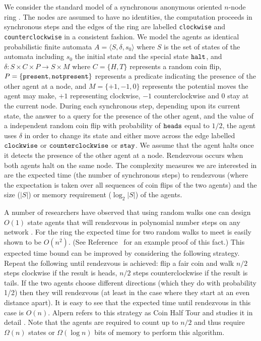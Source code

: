 \documentclass[lotsofwhite]{patmorin}
\begin{document}
We consider the standard model of a synchronous anonymous oriented
$n$-node ring \cite{santoro}. The nodes are assumed to have no
identities, the computation proceeds in synchronous steps and the
edges of the ring are labelled {\tt clockwise} and {\tt
counterclockwise} in a consistent fashion.  We model the agents as
identical probabilistic finite automata $A = \langle S, \delta, s_0
\rangle$ where
$S$ is the set of states of the automata including $s_0$ the initial
state and the special state ${\tt halt}$, and $\delta:S \times C
\times P \to S \times M$ where $C = \{ H, T \}$ represents a random
coin flip, $P = \{ \tt present, notpresent \}$ represents a predicate
indicating the presence of the other agent at a node, and $M = \{ +1,
-1, 0 \}$ represents the potential moves the agent may make, $+1$
representing clockwise, $-1$ counterclockwise and $0$ stay at the
current node.  During each synchronous step, depending upon its
current state, the answer to a query for the presence of the other
agent, and the value of a independent random coin flip with
probability of $\tt heads$ equal to $1/2$, the agent uses $\delta$ in
order to change its state and either move across the edge labelled $\tt
clockwise$ or $\tt counterclockwise$ or $\tt stay$.  We assume that the
agent halts once it detects the presence of the other agent at a node.
Rendezvous occurs when both agents halt on the same node.  The
complexity measures  we are interested in are the expected time (the
number of synchronous steps) to rendezvous (where the expectation is
taken over all sequences of coin flips of the two agents) and the size
($|S|$) or memory requirement ($\log_2 |S|$) of the agents.  

A number of researchers have observed that using random walks one can
design $O(1)$ state agents that will rendezvous in polynomial number
steps on any network \cite{coppersmith}. For the ring the expected
time for two random walks to meet is easily shown to be $O(n^2)$. (See
Reference~\cite{kk} for an example proof of this fact.) This expected time bound
can be improved by considering the following strategy.  Repeat the
following until rendezvous is achieved: flip a fair coin and walk
$n/2$ steps clockwise if the result is heads, $n/2$ steps
counterclockwise if the result is tails.  If the two agents choose
different directions (which they do with probability 1/2) then they
will rendezvous (at least in the case where they start at an even
distance apart).  It is easy to see that the expected time until
rendezvous in this case is $O(n)$. Alpern refers to this strategy as
Coin Half Tour and studies it in detail \cite{alpern95}.  Note that
the agents are required to count up to $n/2$ and thus require $\Omega(n)$
states or $\Omega(\log n)$ bits of memory to perform this algorithm. 
\end{document}
